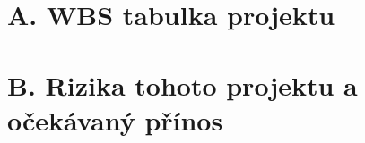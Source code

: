 
\section*{A. WBS tabulka projektu}
\label{sec:WBS}

\section*{B. Rizika tohoto projektu a očekávaný přínos}
\label{sec:Rizika tohoto projektu a ocekavany prinos}

